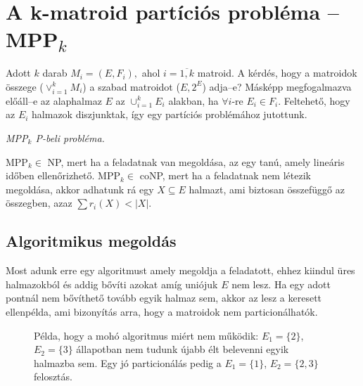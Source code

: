 \section{\texorpdfstring{A k-matroid partíciós probléma -- MPP\textsubscript{$k$}}
		 {A k-matroid partíciós probléma}}

Adott $k$ darab $M_i = (E, F_i),$ ahol $i={\overline{1,k}}$ matroid. A kérdés,
hogy a matroidok összege ($\vee_{i=1}^{k}M_i$) a szabad matroidot ($E,2^E$)
adja--e? Másképp megfogalmazva előáll--e az alaphalmaz $E$ az $\cup_{i=1}^{k}
E_i$ alakban, ha $\forall i$-re $E_i \in F_i$. Feltehető, hogy az $E_i$ halmazok
diszjunktak, így egy partíciós problémához jutottunk.

\vspace{0.4cm}
\emph{MPP$_k$ P-beli probléma.}
\vspace{0.4cm}

MPP$_k \in$ NP, mert ha a feladatnak van megoldása, az egy tanú, amely lineáris időben
ellenőrizhető. MPP$_k \in$ coNP, mert ha a feladatnak nem létezik megoldása, akkor
adhatunk rá egy $X \subseteq E$ halmazt, ami biztosan összefüggő az összegben, azaz
$\sum r_i (X) < |X|$.

\subsection{Algoritmikus megoldás}

Most adunk erre egy algoritmust amely megoldja a feladatott, ehhez kiindul üres
halmazokból és addig bővíti azokat amíg uniójuk $E$ nem lesz. Ha egy adott
pontnál nem bővíthető tovább egyik halmaz sem, akkor az lesz a keresett ellenpélda,
ami bizonyítás arra, hogy a matroidok nem particionálhatók.

\begin{figure}[htbp]
\caption{Példa, hogy a mohó algoritmus miért nem működik:
		  $E_1 = \{2\}$, $E_2 = \{3\}$ állapotban nem tudunk újabb élt
		  belevenni egyik halmazba sem. Egy jó particionálás pedig a
		  $E_1 = \{ 1 \}$, $E_2 = \{ 2, 3 \}$ felosztás.}
\label{fig:MPPMohoNem}
\centering {}
\end{figure}

